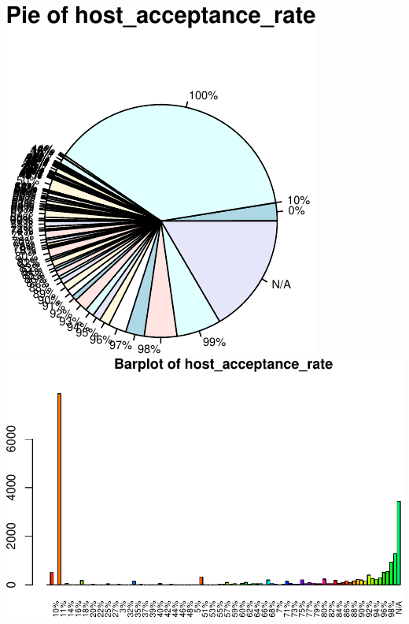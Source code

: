\includegraphics{anal_files/figure-latex/unnamed-chunk-7-6.pdf}
\includegraphics{anal_files/figure-latex/unnamed-chunk-7-7.pdf}

